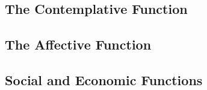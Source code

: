 \subsection{The Contemplative Function}

\subsection{The Affective Function}

\subsection{Social and Economic Functions}























